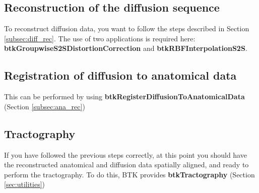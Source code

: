 \subsection{Reconstruction of the diffusion sequence}
To reconstruct diffusion data, you want to follow the steps described in
Section \ref{subsec:diff_rec}. The use of two applications is required here:
\textbf{btkGroupwiseS2SDistortionCorrection} and
\textbf{btkRBFInterpolationS2S}.

\subsection{Registration of diffusion to anatomical data}
This can be performed by using \textbf{btkRegisterDiffusionToAnatomicalData}
(Section \ref{subsec:ana_rec})

\subsection{Tractography}
If you have followed the previous steps correctly, at this point you should
have the reconstructed anatomical and diffusion data spatially aligned, and
ready to perform the tractography. To do this, BTK provides
\textbf{btkTractography} (Section \ref{sec:utilities})
